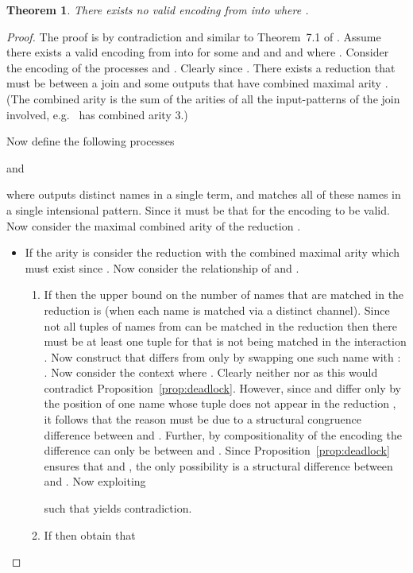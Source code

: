 \documentclass[submission,copyright,creativecommons]{eptcs}
\newtheorem{theorem}{Theorem}[section]
\begin{document}
\begin{theorem}
\label{thm:no_int_2_join}
There exists no valid encoding from  into  where .
\end{theorem}
\begin{proof}
The proof is by contradiction and similar to Theorem~7.1 of \cite{givenwilson:hal-01026301}.
Assume there exists a valid encoding  from  into
 for some  and  and  and 
where .
Consider the encoding of the processes  and .
Clearly   since .
There exists a reduction  that must be between a
join and some outputs that have combined maximal arity .
(The combined arity is the sum of the arities of all the input-patterns of the join involved,
e.g.~ has combined arity 3.)

Now define the following processes 

and

where  outputs  distinct names in a single term, and  matches all of these names in
a single intensional pattern.
Since  it must be that 
for the encoding to be valid.
Now consider the maximal combined arity of the reduction .
\begin{itemize}
\item If the arity is  
  consider the reduction  with the combined maximal arity  which
  must exist since .
  Now consider the relationship of  and .
  \begin{enumerate}
  \item If  
    then the upper bound on the number of names that are matched in the
    reduction is  (when each name is matched via a distinct channel).
    Since not all  tuples of names from  can be matched in the reduction then
    there must be at least one tuple  for  that is not being
    matched in the interaction .
    Now construct  that differs from  only by swapping one such name  with
    : .
    Now consider the context 
    where .
    Clearly neither  nor
     as this would contradict
    Proposition~\ref{prop:deadlock}.
    However, since  and  differ only by the position of one name whose tuple 
    does not appear in the
    reduction , it follows that the reason 
     must be due to a structural
    congruence difference between 
    and .
    Further, by compositionality of the encoding the difference can only be between
     and .
    Since Proposition~\ref{prop:deadlock} ensures that 
    and , the only possibility is a structural difference
    between  and .
    Now exploiting 
    
    such that 
    yields contradiction.
\item If  then obtain that 
\end{enumerate}
\end{itemize}
\end{proof}
\end{document}
